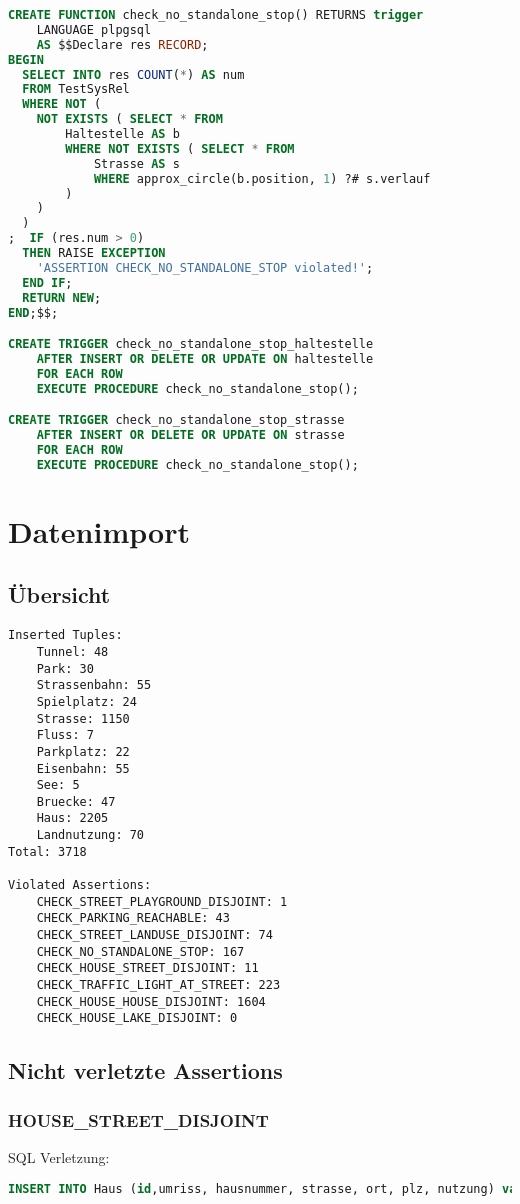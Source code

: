 \documentclass[a4paper]{article}
\begin{document}
\begin{lstlisting}[language=sql]
CREATE FUNCTION check_no_standalone_stop() RETURNS trigger
    LANGUAGE plpgsql
    AS $$Declare res RECORD;
BEGIN
  SELECT INTO res COUNT(*) AS num
  FROM TestSysRel
  WHERE NOT (
    NOT EXISTS ( SELECT * FROM
        Haltestelle AS b
        WHERE NOT EXISTS ( SELECT * FROM
            Strasse AS s
            WHERE approx_circle(b.position, 1) ?# s.verlauf
        )
    )
  )
;  IF (res.num > 0)
  THEN RAISE EXCEPTION
    'ASSERTION CHECK_NO_STANDALONE_STOP violated!';
  END IF;
  RETURN NEW;
END;$$;

CREATE TRIGGER check_no_standalone_stop_haltestelle
    AFTER INSERT OR DELETE OR UPDATE ON haltestelle
    FOR EACH ROW
    EXECUTE PROCEDURE check_no_standalone_stop();

CREATE TRIGGER check_no_standalone_stop_strasse
    AFTER INSERT OR DELETE OR UPDATE ON strasse
    FOR EACH ROW
    EXECUTE PROCEDURE check_no_standalone_stop();

\end{lstlisting}

\section{Datenimport}
\subsection{Übersicht}

\begin{verbatim}
Inserted Tuples:
    Tunnel: 48
    Park: 30
    Strassenbahn: 55
    Spielplatz: 24
    Strasse: 1150
    Fluss: 7
    Parkplatz: 22
    Eisenbahn: 55
    See: 5
    Bruecke: 47
    Haus: 2205
    Landnutzung: 70
Total: 3718

Violated Assertions:
    CHECK_STREET_PLAYGROUND_DISJOINT: 1
    CHECK_PARKING_REACHABLE: 43
    CHECK_STREET_LANDUSE_DISJOINT: 74
    CHECK_NO_STANDALONE_STOP: 167
    CHECK_HOUSE_STREET_DISJOINT: 11
    CHECK_TRAFFIC_LIGHT_AT_STREET: 223
    CHECK_HOUSE_HOUSE_DISJOINT: 1604
    CHECK_HOUSE_LAKE_DISJOINT: 0
\end{verbatim}

\subsection{Nicht verletzte Assertions}

\subsubsection{HOUSE\_STREET\_DISJOINT}
SQL Verletzung: 
\begin{lstlisting}[language=sql,breaklines=true]
INSERT INTO Haus (id,umriss, hausnummer, strasse, ort, plz, nutzung) values('3457842','((52.2658021,10.5088862),(52.2658321,10.5082349))','42','Kasernenstrasse','Braunschweig','38102',NULL)
\end{lstlisting}
\end{document}
